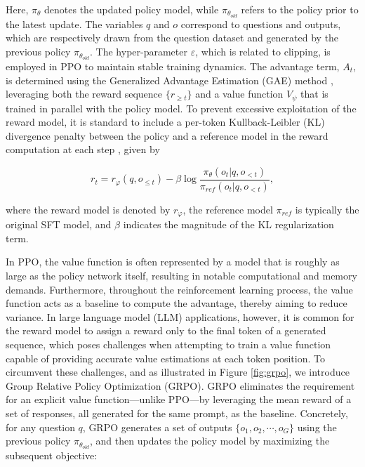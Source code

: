 \begin{itemize}[topsep=0pt]
\begin{itemize}[topsep=0pt]
Here, $\pi_{\theta}$ denotes the updated policy model, while $\pi_{\theta_{old}}$ refers to the policy prior to the latest update. The variables $q$ and $o$ correspond to questions and outputs, which are respectively drawn from the question dataset and generated by the previous policy $\pi_{\theta_{old}}$. The hyper-parameter $\varepsilon$, which is related to clipping, is employed in PPO to maintain stable training dynamics. The advantage term, $A_t$, is determined using the Generalized Advantage Estimation (GAE) method \citep{gae}, leveraging both the reward sequence $\{r_{\ge t}\}$ and a value function $V_{\psi}$ that is trained in parallel with the policy model. To prevent excessive exploitation of the reward model, it is standard to include a per-token Kullback-Leibler (KL) divergence penalty between the policy and a reference model in the reward computation at each step \citep{ouyang2022training}, given by

\begin{equation}
    r_{t} = r_\varphi(q, o_{\le t}) - \beta \log\frac{\pi_{\theta}(o_{t}|q, o_{<t})}{\pi_{ref}(o_{t}|q, o_{<t})},
\label{eq:PPO-reward}
\end{equation}

where the reward model is denoted by $r_\varphi$, the reference model $\pi_{ref}$ is typically the original SFT model, and $\beta$ indicates the magnitude of the KL regularization term.

In PPO, the value function is often represented by a model that is roughly as large as the policy network itself, resulting in notable computational and memory demands. Furthermore, throughout the reinforcement learning process, the value function acts as a baseline to compute the advantage, thereby aiming to reduce variance. In large language model (LLM) applications, however, it is common for the reward model to assign a reward only to the final token of a generated sequence, which poses challenges when attempting to train a value function capable of providing accurate value estimations at each token position. To circumvent these challenges, and as illustrated in Figure \ref{fig:grpo}, we introduce Group Relative Policy Optimization (GRPO). GRPO eliminates the requirement for an explicit value function—unlike PPO—by leveraging the mean reward of a set of responses, all generated for the same prompt, as the baseline. Concretely, for any question $q$, GRPO generates a set of outputs $\{o_1, o_2, \cdots, o_G\}$ using the previous policy $\pi_{\theta_{old}}$, and then updates the policy model by maximizing the subsequent objective:


\end{itemize}
\end{itemize}
